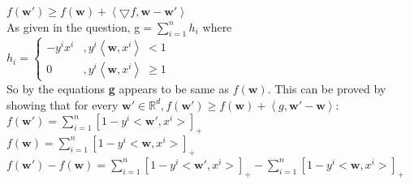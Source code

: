 \documentclass[a4paper,11pt]{article}
\begin{document}
\begin{mlsolution}
\begin{math}
f\left ( \textbf{w}{}' \right ) \geq f\left ( \textbf{w}{} \right ) + \left \langle \bigtriangledown f, \textbf{w} - \textbf{w}{}' \right \rangle
\end{math}\\

As given in the question, 
g\begin{math} = \sum_{i=1}^{n}h_{i} \end{math} where  \\

\begin{math}
h_{i} = \left\{
\begin{matrix}
-y^{i}x^{i} &,  y^{i} \left \langle \textbf{w}, x^{i} \right \rangle \;<  1\\ 
0 & , y^{i} \left \langle \textbf{w}, x^{i} \right \rangle \;\geq  1
\end{matrix}\right.
\end{math}\\

So by the equations \textbf{g} appears to be same as \begin{math}f\left ( \textbf{w} \right ).\end{math} This can be proved by showing that for every \begin{math}\textbf{w}{}' \in \mathbb{R}^{d}, f\left ( \textbf{w}{}' \right ) \geq f\left ( \textbf{w} \right ) + \left \langle g, \textbf{w}{}' - \textbf{w} \right \rangle:\end{math}\\

\begin{math}
f\left ( \textbf{w}{}' \right ) = \sum_{i=1}^{n} \left [  1 - y^{i}<\textbf{w}{}', x^{i}> \right ]_{+} \end{math}\\

\begin{math}f\left ( \textbf{w} \right ) = \sum_{i=1}^{n} \left [  1 - y^{i}<\textbf{w}, x^{i}> \right ]_{+}
\end{math}\\

\begin{math}
f\left ( \textbf{w}{}' \right ) - f\left ( \textbf{w} \right ) = \sum_{i=1}^{n} \left [  1 - y^{i}<\textbf{w}{}', x^{i}> \right ]_{+} - \sum_{i=1}^{n} \left [  1 - y^{i}<\textbf{w}, x^{i}> \right ]_{+}
\end{math}\\


\end{mlsolution}
\end{document}
